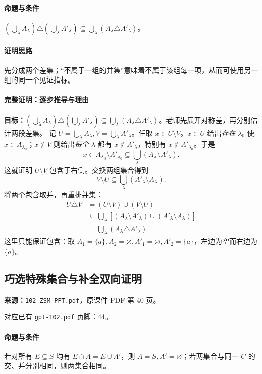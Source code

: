\paragraph{命题与条件}$(\bigcup_\lambda A_\lambda)\triangle(\bigcup_\lambda A'_\lambda)\subseteq\bigcup_\lambda(A_\lambda\triangle A'_\lambda)$。
\paragraph{证明思路}先分成两个差集；“不属于一组的并集”意味着不属于该组每一项，从而可使用另一组的同一个见证指标。
\paragraph{完整证明：逐步推导与理由}
\textbf{目标：}$ (\bigcup_\lambda A_\lambda)\triangle(\bigcup_\lambda A'_\lambda)\subseteq\bigcup_\lambda(A_\lambda\triangle A'_\lambda)$。老师先展开对称差，再分别估计两段差集。
记 $U=\bigcup_\lambda A_\lambda,V=\bigcup_\lambda A'_\lambda$。任取 $x\in U\setminus V$。$x\in U$ 给出\emph{存在} $\lambda_0$ 使 $x\in A_{\lambda_0}$；$x\notin V$ 则给出\emph{每个} $\lambda$ 都有 $x\notin A'_\lambda$，特别有 $x\notin A'_{\lambda_0}$。于是
\[
x\in A_{\lambda_0}\setminus A'_{\lambda_0}\subseteq\bigcup_\lambda(A_\lambda\setminus A'_\lambda).
\]
这就证明 $U\setminus V$ 包含于右侧。交换两组集合得到
\[V\setminus U\subseteq\bigcup_\lambda(A'_\lambda\setminus A_\lambda).\]
将两个包含取并，再重排并集：
\begin{align*}
U\triangle V&=(U\setminus V)\cup(V\setminus U)\\
&\subseteq\bigcup_\lambda[(A_\lambda\setminus A'_\lambda)\cup(A'_\lambda\setminus A_\lambda)]\\
&=\bigcup_\lambda(A_\lambda\triangle A'_\lambda).
\end{align*}
这里只能保证包含：取 $A_1=\{a\},A_2=\varnothing,A'_1=\varnothing,A'_2=\{a\}$，左边为空而右边为 $\{a\}$。
\clearpage\subsection{巧选特殊集合与补全双向证明}
\textbf{来源：}\texttt{102-ZSM-PPT.pdf}，原课件 PDF 第 40 页。\par
对应已有 \texttt{gpt-102.pdf} 页脚：44。\par
\paragraph{命题与条件}若对所有 $E\subseteq S$ 均有 $E\cap A=E\cup A'$，则 $A=S,A'=\varnothing$；若两集合与同一 $C$ 的交、并分别相同，则两集合相同。
